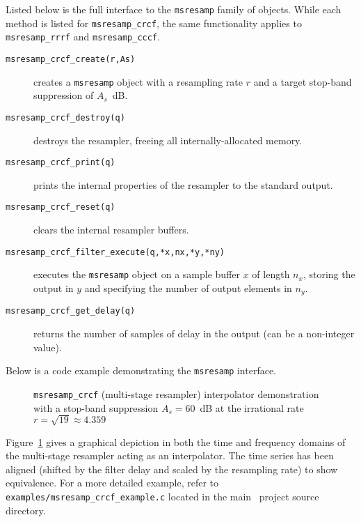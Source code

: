 Listed below is the full interface to the {\tt msresamp} family of
objects.
While each method is listed for {\tt msresamp\_crcf}, the same
functionality applies to {\tt msresamp\_rrrf} and {\tt msresamp\_cccf}.
%
\begin{description}
\item[{\tt msresamp\_crcf\_create(r,As)}]
    creates a {\tt msresamp} object with a resampling rate $r$
    and a target stop-band suppression of $A_s$~dB.
\item[{\tt msresamp\_crcf\_destroy(q)}]
    destroys the resampler, freeing all internally-allocated memory.
\item[{\tt msresamp\_crcf\_print(q)}]
    prints the internal properties of the resampler to the standard
    output.
\item[{\tt msresamp\_crcf\_reset(q)}]
    clears the internal resampler buffers.
\item[{\tt msresamp\_crcf\_filter\_execute(q,*x,nx,*y,*ny)}]
    executes the {\tt msresamp} object on a sample buffer $x$ of length
    $n_x$, storing the output in $y$ and specifying the number of output
    elements in $n_y$.
\item[{\tt msresamp\_crcf\_get\_delay(q)}]
    returns the number of samples of delay in the output
    (can be a non-integer value).
\end{description}
%
Below is a code example demonstrating the {\tt msresamp} interface.
%

%
\begin{figure}
\centering
{}
\caption{{\tt msresamp\_crcf} (multi-stage resampler) interpolator
         demonstration with a stop-band suppression $A_s=60$~dB
         at the irrational rate $r = \sqrt{19} \approx 4.359$}
\label{fig:module:filter:msresamp_crcf}
\end{figure}
%
Figure~\ref{fig:module:filter:msresamp_crcf} gives a graphical depiction
in both the time and frequency domains
of the multi-stage resampler acting as an interpolator.
The time series has been aligned (shifted by the filter delay and scaled by
the resampling rate) to show equivalence.
%
For a more detailed example, refer to
{\tt examples/msresamp\_crcf\_example.c}
located in the main \liquid\ project source directory.


